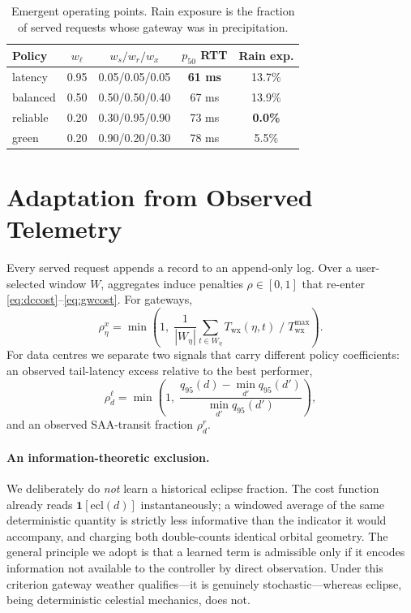 \documentclass[10pt,twocolumn]{article}
\newcommand{\Ind}[1]{\mathbf{1}\!\left[#1\right]}
\begin{document}
\begin{table}[t]
\centering
\caption{Emergent operating points. Rain exposure is the fraction of served
requests whose gateway was in precipitation.}
\label{tab:policy}
\small
\begin{tabular}{@{}lcccc@{}}
\toprule
Policy & $w_{\ell}$ & $w_{s}/w_{r}/w_{x}$ & $p_{50}$ RTT & Rain exp. \\
\midrule
latency  & 0.95 & 0.05/0.05/0.05 & \textbf{61 ms} & 13.7\% \\
balanced & 0.50 & 0.50/0.50/0.40 & 67 ms & 13.9\% \\
reliable & 0.20 & 0.30/0.95/0.90 & 73 ms & \textbf{0.0\%} \\
green    & 0.20 & 0.90/0.20/0.30 & 78 ms & 5.5\% \\
\bottomrule
\end{tabular}
\end{table}

\section{Adaptation from Observed Telemetry}

Every served request appends a record to an append-only log. Over a
user-selected window $W$, aggregates induce penalties $\rho\in[0,1]$ that
re-enter \eqref{eq:dccost}--\eqref{eq:gwcost}. For gateways,
\begin{equation}
\rho^{x}_{\eta}=\min\!\left(1,\;
\frac{1}{|W_{\eta}|}\sum_{t\in W_{\eta}} T_{\mathrm{wx}}(\eta,t)\;/\;T^{\max}_{\mathrm{wx}}\right).
\end{equation}
For data centres we separate two signals that carry different policy
coefficients: an observed tail-latency excess relative to the best performer,
\begin{equation}
\rho^{\ell}_{d}=\min\!\left(1,\;
\frac{q_{95}(d)-\min_{d'}q_{95}(d')}{\min_{d'}q_{95}(d')}\right),
\end{equation}
and an observed SAA-transit fraction $\rho^{r}_{d}$.

\paragraph{An information-theoretic exclusion.} We deliberately do \emph{not}
learn a historical eclipse fraction. The cost function already reads
$\Ind{\mathrm{ecl}(d)}$ instantaneously; a windowed average of the same
deterministic quantity is strictly less informative than the indicator it would
accompany, and charging both double-counts identical orbital geometry. The
general principle we adopt is that a learned term is admissible only if it
encodes information not available to the controller by direct observation. Under
this criterion gateway weather qualifies---it is genuinely stochastic---whereas
eclipse, being deterministic celestial mechanics, does not.
\end{document}
